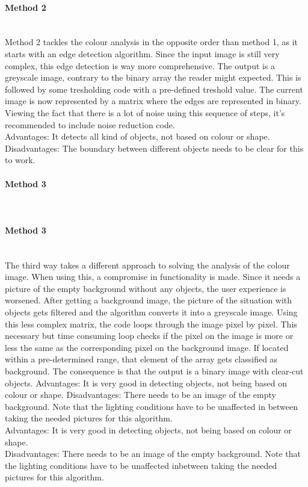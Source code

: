 \documentclass[11pt]{article}
\begin{document}
\paragraph{Method 2}\mbox{}\\
Method 2 tackles the colour analysis in the opposite order than method 1, as it starts with an edge detection algorithm. Since the input image is still very complex, this edge detection is way more comprehensive. The output is a greyscale image, contrary to the binary array the reader might expected. This is followed by some tresholding code with a pre-defined treshold value. The current image is now represented by a matrix where the edges are represented in binary. Viewing the fact that there is a lot of noise using this sequence of steps, it's recommended to include noise reduction code. 
\\Advantages: It detects all kind of objects, not based on colour or shape.
\\Disadvantages: The boundary between different objects needs to be clear for this to work.

\paragraph{Method 3}\mbox{}\\
\paragraph{Method 3}\mbox{}\\
The third way takes a different approach to solving the analysis of the colour image. When using this, a compromise in functionality is made. Since it needs a picture of the empty background without any objects, the user experience is worsened. After getting a background image, the picture of the situation with objects gets filtered and the algorithm converts it into a greyscale image. Using this less complex matrix, the code loops through the image pixel by pixel. This necessary but time consuming loop checks if the pixel on the image is more or less the same as the corresponding pixel on the background image. If located within a pre-determined range, that element of the array gets classified as background. The consequence is that the output is a binary image with clear-cut objects.
Advantages: It is very good in detecting objects, not being based on colour or shape.
Disadvantages: There needs to be an image of the empty background. Note that the lighting conditions have to be unaffected in between taking the needed pictures for this algorithm.
\\Advantages: It is very good in detecting objects, not being based on colour or shape.
\\Disadvantages: There needs to be an image of the empty background. Note that the lighting conditions have to be unaffected inbetween taking the needed pictures for this algorithm.
\end{document}
